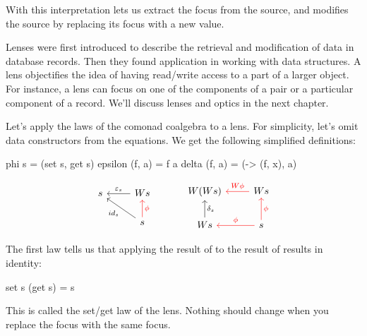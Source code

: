 \documentclass[DaoFP]{subfiles}
\begin{document}
With this interpretation  lets us extract the focus from the source, and  modifies the source by replacing its focus  with a new value.

Lenses were first introduced to describe the retrieval and modification of data in database records. Then they found application in working with data structures. A lens objectifies the idea of having read/write access to a part of a larger object. For instance, a lens can focus on one of the components of a pair or a particular component of a record. We'll discuss lenses and optics in the next chapter.

Let's apply the laws of the comonad coalgebra to a lens. For simplicity, let's omit data constructors from the equations. We get the following simplified definitions:
\begin{haskell}
phi s = (set s, get s)
epsilon (f, a) = f a
delta (f, a) = (\x -> (f, x), a)
\end{haskell}

\[
 \begin{tikzcd}
 s
 & W s
 \arrow[l, "\varepsilon_s"']
 \\
 & s
 \arrow[ul, "id_s"]
\arrow[u, red, "\phi"']
 \end{tikzcd}
  \hspace{30pt}
 \begin{tikzcd}
W(W s) 
&W s
\arrow[l, red, "W \phi "']
\\
W s
\arrow[u, "\delta_s"']
& s
\arrow[l, red, "\phi"']
\arrow[u, red, "\phi"']
 \end{tikzcd}
\]


The first law  tells us that applying the result of  to the result of  results in identity:
\begin{haskell}
set s (get  s) = s
\end{haskell}
This is called the set/get law of the lens. Nothing should change when you replace the focus with the same focus.
\end{document}
